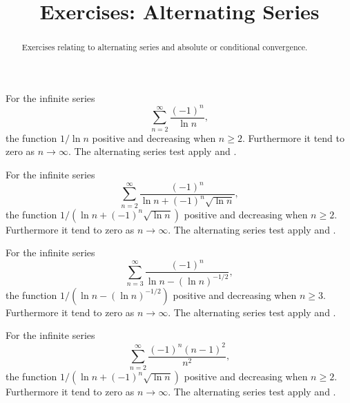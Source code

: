 \documentclass{ximera}
\title{Exercises: Alternating Series}
\begin{document}
\begin{abstract}
Exercises relating to alternating series and absolute or conditional convergence.
\end{abstract}
\maketitle


\begin{exercise}
For the infinite series
\[ \sum_{n=2}^\infty \frac{(-1)^n}{ \ln n}, \]
the function $1/\ln n$  positive and   decreasing when $n \geq 2$. Furthermore it  tend to zero as $n \rightarrow \infty$. The alternating series test  apply and .
\end{exercise}

\begin{exercise}
For the infinite series
\[ \sum_{n=2}^\infty \frac{(-1)^n}{ \ln n + (-1)^n \sqrt{\ln n}}, \]
the function $1/(\ln n+(-1)^n \sqrt{\ln n})$  positive and  decreasing when $n \geq 2$. Furthermore it  tend to zero as $n \rightarrow \infty$. The alternating series test  apply and .
\end{exercise}

\begin{exercise}
For the infinite series
\[ \sum_{n=3}^\infty \frac{(-1)^n}{ \ln n - (\ln n)^{-1/2}}, \]
the function $1/(\ln n - (\ln n)^{-1/2})$  positive and  decreasing when $n \geq 3$. Furthermore it  tend to zero as $n \rightarrow \infty$. The alternating series test  apply and .
\end{exercise}


\begin{exercise}
For the infinite series
\[ \sum_{n=2}^\infty \frac{(-1)^n (n-1)^2}{n^2}, \]
the function $1/(\ln n+(-1)^n \sqrt{\ln n})$  positive and  decreasing when $n \geq 2$. Furthermore it  tend to zero as $n \rightarrow \infty$. The alternating series test  apply and .
\end{exercise}
\end{document}
